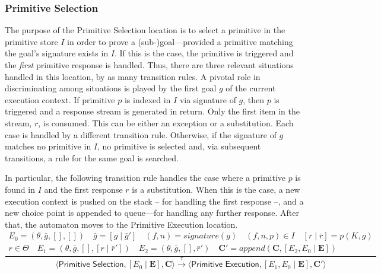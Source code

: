 \documentclass{article}
\newcommand{\stateStyle}[1]{\textsf{#1}}
\newcommand{\state}[1]{\stateStyle{#1}}
\newcommand{\stream}[1]{\bar{#1}}
\newcommand{\vect}[1]{\mathbf{#1}}
\newcommand{\f}[1]{\mathit{#1}}
\newcommand{\fx}[2]{\f{#1}(#2)}
\newcommand{\transition}[1]{\xrightarrow{\ #1\ }}
\begin{document}
\subsubsection{Primitive Selection}

The purpose of the \state{Primitive Selection} location is to select a primitive in the primitive store $I$ in order to prove a (sub-)goal---provided a primitive matching the goal's signature exists in $I$.
%
If this is the case, the primitive is triggered and the \emph{first} primitive response is handled.
%
Thus, there are three relevant situations handled in this location, by as many transition rules.
%
A pivotal role in discriminating among situations is played by the first goal $g$ of the current execution context.
%   
If primitive $p$ is indexed in $I$ via signature of $g$, then $p$ is triggered and a response stream is generated in return.
%
Only the first item in the stream, $r$, is consumed.
%
This can be either an exception or a substitution. Each case is handled by a different transition rule.
%
Otherwise, if the signature of $g$ matches no primitive in $I$, no primitive is selected and, via subsequent transitions, a rule for the same goal is searched.

In particular, the following transition rule handles the case where a primitive $p$ is found in $I$ and the first response $r$ is a substitution.
%
When this is the case, a new execution context is pushed on the stack -- for handling the first response --, and a new choice point is appended to queue---for handling any further response.
%
After that, the automaton moves to the \state{Primitive Execution} location.
%
\[
    \frac{
        \begin{array}{c}
            E_0 = (\theta, \stream{g}, [], [])
            \quad
            \stream{g} = [g \mid \stream{g}']
            \quad
            (f, n) = \fx{signature}{g}
            \quad
            (f, n, p) \in I
            \quad
            [r \mid \stream{r}] = p(K, g)
            \\
            r \in \Theta
            \quad
            E_1 = (\theta, \stream{g}, [], [r \mid \stream{r}'])
            \quad
            E_2 = (\theta, \stream{g}, [], \stream{r}')
            \quad
            \vect{C}' = \fx{append}{\vect{C}, [E_2, E_0 \mid \vect{E}]}
        \end{array}
    }{
        \langle \state{Primitive Selection}, [E_0 \mid \vect{E}], \vect{C} \rangle
        \transition{\tau}
        \langle \state{Primitive Execution}, [E_1, E_0 \mid \vect{E}], \vect{C}' \rangle
    }
\]
%
%
%
\end{document}
